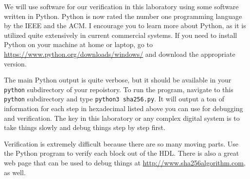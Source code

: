\documentclass{article}
\begin{document}
We will use software for our verification in this laboratory 
using some software written in Python.  Python is now rated the
number one programming language by the IEEE and the ACM.  I encourage
you to learn more about Python, as it is utilized quite extensively in
current commercial systems.
If you need to install Python on your machine at home or laptop, go to
\url{https://www.python.org/downloads/windows/} and
download the appropriate version.

The main Python output is quite verbose, but it should be available in
your \verb!python! subdirectory of your repoistory.  To run the program,
navigate to this \verb!python! subdirectory and type
\verb!python3 sha256.py!.  It will output a ton of information for
each step in hexadecimal listed above you can use for debugging and
verification.  The
key in this laboratory or any complex digital system
is to take things slowly and debug things step by step first.  

Verification is extremely difficult
because there are so many moving parts.  Use the
Python program to verify each block out of the HDL.  There is also a
great web page that can be used to debug things at
\url{http://www.sha256algorithm.com}, as well.
\end{document}
